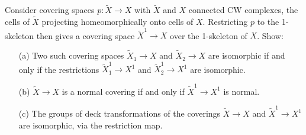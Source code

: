 \documentclass[12pt]{article}
\begin{document}
\begin{statement} 
  Consider covering spaces $p:\tilde{X} \to X$ with $\tilde{X}$ and $X$ connected CW complexes,
  the cells of $\tilde{X}$ projecting homeomorphically onto cells of $X$. Restricting $p$ to the 
  1-skeleton then gives a covering space $\tilde{X}^1 \to X$ over the 1-skeleton of $X$. Show:
  \begin{itemize}
    \item[(a)] Two such covering spaces $\tilde{X}_1 \to X$ and $\tilde{X}_2 \to X$ are isomorphic 
      if and only if the restrictions $\tilde{X}^1_1 \to X^1$ and $\tilde{X}^1_2 \to X^1$ are 
      isomorphic. 
    \item[(b)] $\tilde{X} \to X$ is a normal covering if and only if $\tilde{X}^1 \to X^1$ is normal.
    \item[(c)] The groups of deck transformations of the coverings $\tilde{X} \to X$ and 
      $\tilde{X}^1 \to X^1$ are isomorphic, via the restriction map. 
  \end{itemize}
\end{statement}
\end{document}
